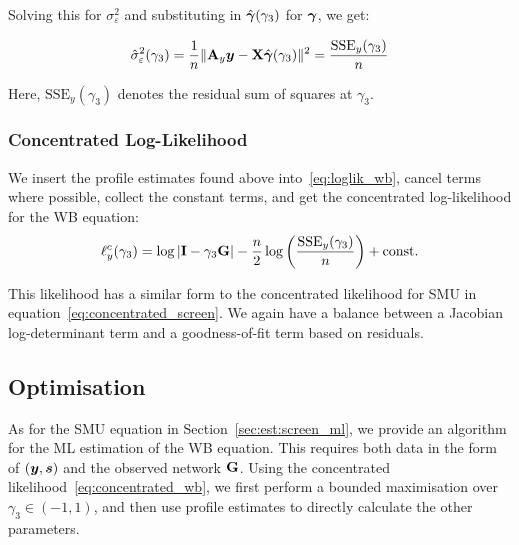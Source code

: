 Solving this for $\sigma_\varepsilon^2$ and substituting in $\hat{\bm{\gamma}}(\gamma_3)$ for $\bm{\gamma}$, we get:

\begin{equation}
    \hat\sigma_\varepsilon^2(\gamma_3) =
    \frac{1}{n}\|\mathbf{A}_y\bm{y} - \mathbf{X}\hat{\bm{\gamma}}(\gamma_3)\|^2
    = \frac{\text{SSE}_y(\gamma_3)}{n}
\end{equation}

Here, $\text{SSE}_y(\gamma_3)$ denotes the residual sum of squares at $\gamma_3$.

\subsubsection{Concentrated Log-Likelihood}

We insert the profile estimates found above into~\eqref{eq:loglik_wb}, cancel terms where possible, collect the constant terms, and get the concentrated log-likelihood for the WB equation:
\begin{equation}
\label{eq:concentrated_wb}
    \ell_y^c(\gamma_3) = \log|\mathbf{I} - \gamma_3\mathbf{G}|
    - \frac{n}{2}\log\left(\frac{\text{SSE}_y(\gamma_3)}{n}\right) + \text{const.}
\end{equation}

This likelihood has a similar form to the concentrated likelihood for SMU in equation~\eqref{eq:concentrated_screen}. We again have a balance between a Jacobian log-determinant term and a goodness-of-fit term based on residuals.

\subsection{Optimisation}
As for the SMU equation in Section~\ref{sec:est:screen_ml}, we provide an algorithm for the ML estimation of the WB equation. This requires both data in the form of $(\bm{y}, \bm{s})$ and the observed network $\mathbf{G}$. Using the concentrated likelihood~\eqref{eq:concentrated_wb}, we first perform a bounded maximisation over $\gamma_3 \in (-1, 1)$, and then use profile estimates to directly calculate the other parameters.

